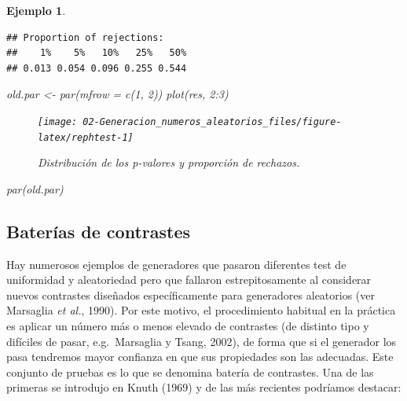 \documentclass[
]{book}
\newenvironment{Shaded}{\begin{snugshade}}{\end{snugshade}}
\newcommand{\AttributeTok}[1]{\textcolor[rgb]{0.77,0.63,0.00}{#1}}
\newcommand{\DecValTok}[1]{\textcolor[rgb]{0.00,0.00,0.81}{#1}}
\newcommand{\FunctionTok}[1]{\textcolor[rgb]{0.00,0.00,0.00}{#1}}
\newcommand{\NormalTok}[1]{#1}
\newcommand{\OtherTok}[1]{\textcolor[rgb]{0.56,0.35,0.01}{#1}}
\newcommand{\SpecialCharTok}[1]{\textcolor[rgb]{0.00,0.00,0.00}{#1}}
\theoremstyle{break}
\newtheorem{example}{Ejemplo}[chapter]
\theoremstyle{nonumberplain}
\begin{document}
\begin{example}
\begin{verbatim}
## Proportion of rejections:
##    1%    5%   10%   25%   50% 
## 0.013 0.054 0.096 0.255 0.544
\end{verbatim}

\begin{Shaded}
\begin{Highlighting}[]
\NormalTok{old.par }\OtherTok{\textless{}{-}} \FunctionTok{par}\NormalTok{(}\AttributeTok{mfrow =} \FunctionTok{c}\NormalTok{(}\DecValTok{1}\NormalTok{, }\DecValTok{2}\NormalTok{))}
\FunctionTok{plot}\NormalTok{(res, }\DecValTok{2}\SpecialCharTok{:}\DecValTok{3}\NormalTok{)}
\end{Highlighting}
\end{Shaded}

\begin{figure}[!htb]

{\centering \texttt{[image: 02-Generacion\_numeros\_aleatorios\_files/figure-latex/rephtest-1]} 

}

\caption{Distribución de los p-valores y proporción de rechazos.}\label{fig:rephtest}
\end{figure}

\begin{Shaded}
\begin{Highlighting}[]
\FunctionTok{par}\NormalTok{(old.par)}
\end{Highlighting}
\end{Shaded}

\end{example}

\hypertarget{baterias}{%
\subsection{Baterías de contrastes}\label{baterias}}

Hay numerosos ejemplos de generadores que pasaron diferentes test de uniformidad y aleatoriedad pero que fallaron estrepitosamente al considerar nuevos contrastes diseñados específicamente para generadores aleatorios (ver Marsaglia \emph{et al.}, 1990).
Por este motivo, el procedimiento habitual en la práctica es aplicar un número más o menos elevado de contrastes (de distinto tipo y difíciles de pasar, e.g.~Marsaglia y Tsang, 2002), de forma que si el generador los pasa tendremos mayor confianza en que sus propiedades son las adecuadas.
Este conjunto de pruebas es lo que se denomina batería de contrastes. Una de las primeras se introdujo en Knuth (1969) y de las más recientes podríamos destacar:
\end{document}
